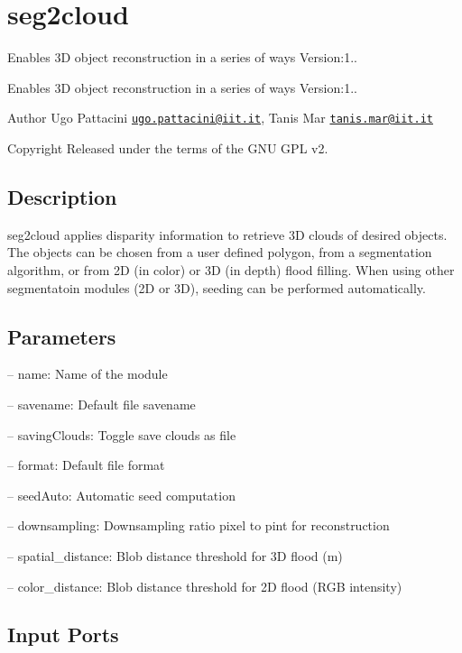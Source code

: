 \section{seg2cloud}
\label{group__seg2cloud}


Enables 3D object reconstruction in a series of ways Version\+:1..  


Enables 3D object reconstruction in a series of ways Version\+:1.. 

\begin{DoxyAuthor}{Author}
Ugo Pattacini \href{mailto:ugo.pattacini@iit.it}{\tt ugo.\+pattacini@iit.\+it}, Tanis Mar \href{mailto:tanis.mar@iit.it}{\tt tanis.\+mar@iit.\+it} ~\newline
 
\end{DoxyAuthor}
\begin{DoxyCopyright}{Copyright}
Released under the terms of the G\+NU G\+PL v2. 
\end{DoxyCopyright}
\hypertarget{group__seg2cloud_intro_sec}{}\subsection{Description}\label{group__seg2cloud_intro_sec}
seg2cloud applies disparity information to retrieve 3D clouds of desired objects. The objects can be chosen from a user defined polygon, from a segmentation algorithm, or from 2D (in color) or 3D (in depth) flood filling. When using other segmentatoin modules (2D or 3D), seeding can be performed automatically.\hypertarget{group__seg2cloud_parameters_sec}{}\subsection{Parameters}\label{group__seg2cloud_parameters_sec}

\begin{DoxyItemize}
\item -- name\+: Name of the module
\item -- savename\+: Default file savename
\item -- saving\+Clouds\+: Toggle save clouds as file
\item -- format\+: Default file format
\item -- seed\+Auto\+: Automatic seed computation
\item -- downsampling\+: Downsampling ratio pixel to pint for reconstruction
\item -- spatial\+\_\+distance\+: Blob distance threshold for 3D flood (m)
\item -- color\+\_\+distance\+: Blob distance threshold for 2D flood (R\+GB intensity) 
\end{DoxyItemize}\hypertarget{group__seg2cloud_inputports_sec}{}\subsection{Input Ports}\label{group__seg2cloud_inputports_sec}

